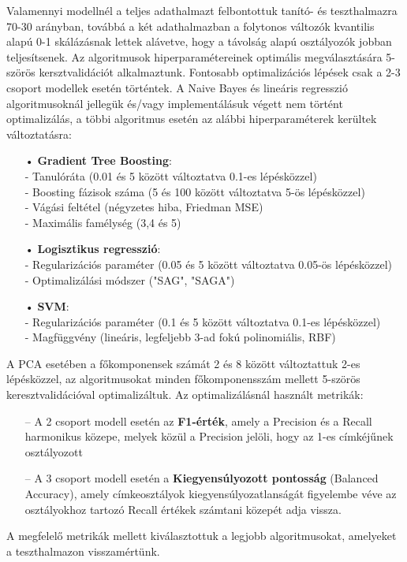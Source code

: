 \documentclass[12pt]{article}
\begin{document}
Valamennyi modellnél a teljes adathalmazt felbontottuk tanító- és teszthalmazra 70-30 arányban, továbbá a két adathalmazban a folytonos változók kvantilis alapú 0-1 skálázásnak lettek alávetve, hogy a távolság alapú osztályozók jobban teljesítsenek. Az algoritmusok hiperparamétereinek optimális megválasztására 5-szörös kersztvalidációt alkalmaztunk.  Fontosabb optimalizációs lépések csak a 2-3 csoport modellek esetén történtek. A Naive Bayes és lineáris regresszió algoritmusoknál jellegük és/vagy implementálásuk végett nem történt optimalizálás, a többi algoritmus esetén az alábbi hiperparaméterek kerültek változtatásra:
\begin{itemize}
\item[•] \textbf{Gradient Tree Boosting}: \\
- Tanulóráta (0.01 és 5 között változtatva 0.1-es lépésközzel)\\
- Boosting fázisok száma (5 és 100 között változtatva 5-ös lépésközzel)\\
- Vágási feltétel (négyzetes hiba, Friedman MSE) \\
- Maximális famélység (3,4 és 5)
\item[•] \textbf{Logisztikus regresszió}: \\
- Regularizációs paraméter (0.05 és 5 között változtatva 0.05-ös lépésközzel) \\
- Optimalizálási módszer ("SAG", "SAGA") 
\item[•] \textbf{SVM}: \\
- Regularizációs paraméter (0.1 és 5 között változtatva 0.1-es lépésközzel)\\
- Magfüggvény (lineáris, legfeljebb 3-ad fokú polinomiális, RBF)
\end{itemize}A PCA esetében a főkomponensek számát 2 és 8 között változtattuk 2-es lépésközzel, az algoritmusokat minden főkomponensszám mellett 5-szörös keresztvalidációval optimalizáltuk. Az optimalizálásnál használt metrikák: 
\begin{itemize}
\item[--]A 2 csoport modell esetén az \textbf{F1-érték}, amely a Precision és a Recall harmonikus közepe, melyek közül a Precision jelöli, hogy az 1-es címkéjűnek osztályozott
\item[--]A 3 csoport modell esetén a \textbf{Kiegyensúlyozott pontosság} (Balanced Accuracy), amely címkeosztályok kiegyensúlyozatlanságát figyelembe véve az osztályokhoz tartozó Recall értékek számtani közepét adja vissza.
\end{itemize}
A megfelelő metrikák mellett kiválasztottuk a legjobb algoritmusokat, amelyeket a teszthalmazon visszamértünk.
\end{document}
